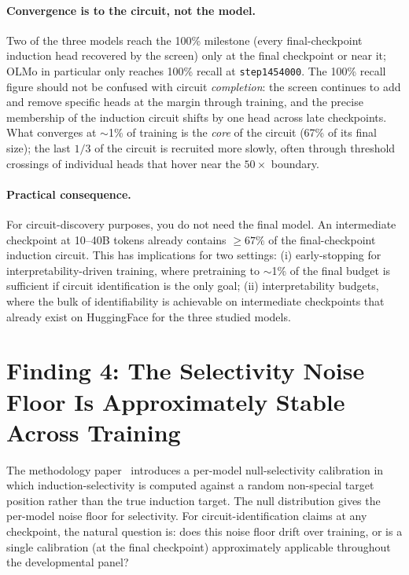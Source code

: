 \documentclass[11pt]{article}
\begin{document}
\paragraph{Convergence is to the circuit, not the model.} Two of the three
models reach the 100\% milestone (every final-checkpoint induction head
recovered by the screen) only at the final checkpoint or near it; OLMo
in particular only reaches 100\% recall at \texttt{step1454000}. The
100\% recall figure should not be confused with circuit \emph{completion}:
the screen continues to add and remove specific heads at the margin
through training, and the precise membership of the induction circuit
shifts by one head across late checkpoints. What converges at $\sim$1\%
of training is the \emph{core} of the circuit (67\% of its final size);
the last $1/3$ of the circuit is recruited more slowly, often through
threshold crossings of individual heads that hover near the $50\times$
boundary.

\paragraph{Practical consequence.} For circuit-discovery purposes, you
do not need the final model. An intermediate checkpoint at 10--40B tokens
already contains $\ge\!67\%$ of the final-checkpoint induction circuit.
This has implications for two settings: (i) early-stopping for
interpretability-driven training, where pretraining to $\sim$1\% of the
final budget is sufficient if circuit identification is the only goal;
(ii) interpretability budgets, where the bulk of identifiability is
achievable on intermediate checkpoints that already exist on
HuggingFace for the three studied models.

\section{Finding 4: The Selectivity Noise Floor Is Approximately Stable Across Training}
\label{sec:f4}

The methodology paper~\citep{paper1_methodology} introduces a per-model
null-selectivity calibration in which induction-selectivity is computed
against a random non-special target position rather than the true
induction target. The null distribution gives the per-model noise floor
for selectivity. For circuit-identification claims at any checkpoint,
the natural question is: does this noise floor drift over training, or
is a single calibration (at the final checkpoint) approximately
applicable throughout the developmental panel?
\end{document}
